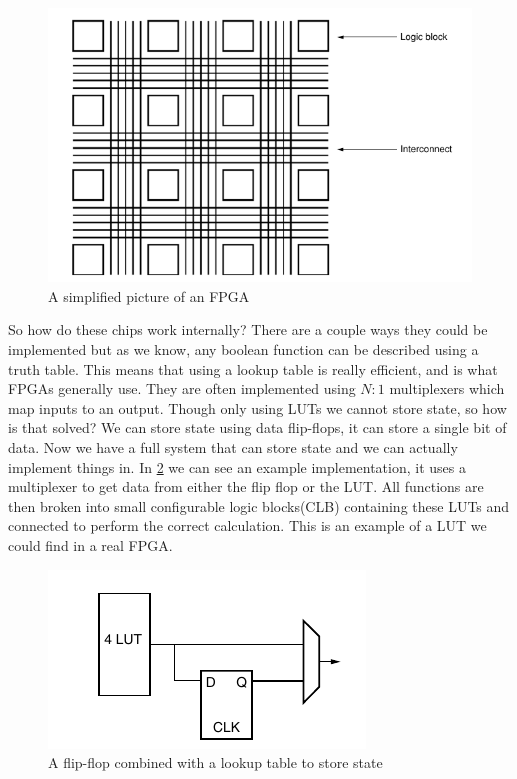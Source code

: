 \documentclass{paper}
\begin{document}
\begin{figure}[ht]
    \centering
    \includegraphics[scale=0.7]{fpga}
    \caption{A simplified picture of an FPGA\cite{reconfSiliconScott}}
    \label{pic:fpga}
\end{figure}

So how do these chips work internally? There are a couple ways they could be
implemented but as we know, any boolean function can be described using a truth
table. This means that using a lookup table is really efficient, and is what
FPGAs generally use. They are often implemented using $N:1$ multiplexers which
map inputs to an output. Though only using LUTs we cannot store state, so how
is that solved? We can store state using data flip-flops, it can store a single
bit of data. Now we have a full system that can store state and we can actually
implement things in. In \ref{pic:flipflop1} we can see an example
implementation, it uses a multiplexer to get data from either the flip flop or
the LUT. All functions are then broken into small configurable logic
blocks(CLB) containing these LUTs and connected to perform the correct
calculation. This is an example of a LUT we could find in a real
FPGA\cite{reconfSiliconScott}.

\begin{figure}
    \centering
    \includegraphics{flipflop}
    \caption{A flip-flop
        combined with a lookup table to store state\cite{reconfSiliconScott}}
    \label{pic:flipflop1}
\end{figure}
\end{document}
